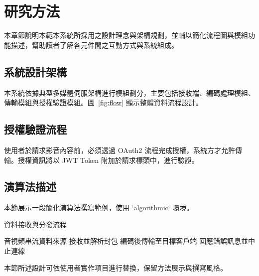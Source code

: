 \chapter{研究方法}

本章節說明本範本系統所採用之設計理念與架構規劃，並輔以簡化流程圖與模組功能描述，幫助讀者了解各元件間之互動方式與系統組成。

\section{系統設計架構}

本系統依據典型多媒體伺服架構進行模組劃分，主要包括接收端、編碼處理模組、傳輸模組與授權驗證模組。圖~\ref{fig:flow} 顯示整體資料流程設計。


\section{授權驗證流程}

使用者於請求影音內容前，必須透過 OAuth2 流程完成授權，系統方才允許傳輸。授權資訊將以 JWT Token 附加於請求標頭中，進行驗證。

\section{演算法描述}

本節展示一段簡化演算法撰寫範例，使用 `algorithmic` 環境。

\begin{algorithm}[H]
\caption{資料接收與分發流程}
\begin{algorithmic}[1]
\REQUIRE 音視頻串流資料來源
\STATE 接收並解析封包
    \STATE 編碼後傳輸至目標客戶端
\ELSE
    \STATE 回應錯誤訊息並中止連線
\ENDIF
\end{algorithmic}
\end{algorithm}

本節所述設計可依使用者實作項目進行替換，保留方法展示與撰寫風格。
